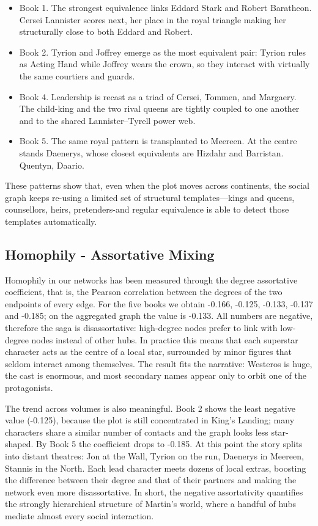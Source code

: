 \documentclass[12pt, a4paper]{article}
\begin{document}
 \begin{itemize}
     \item Book 1. The strongest equivalence links Eddard Stark and Robert Baratheon. Cersei Lannister scores next, her place in the royal triangle making her structurally close to both Eddard and Robert.
     \item Book 2. Tyrion and Joffrey emerge as the most equivalent pair: Tyrion rules as Acting Hand while Joffrey wears the crown, so they interact with virtually the same courtiers and guards.
     \item Book 4. Leadership is recast as a triad of Cersei, Tommen, and Margaery. The child-king and the two rival queens are tightly coupled to one another and to the shared Lannister–Tyrell power web.
     \item Book 5. The same royal pattern is transplanted to Meereen. At the centre stands Daenerys, whose closest equivalents are Hizdahr and Barristan. Quentyn, Daario.
 \end{itemize}

These patterns show that, even when the plot moves across continents, the social graph keeps re-using a limited set of structural templates—kings and queens, counsellors, heirs, pretenders-and regular equivalence is able to detect those templates automatically.

\subsection*{Homophily - Assortative Mixing}

Homophily in our networks has been measured through the degree assortative coefficient, that is, the Pearson correlation between the degrees of the two endpoints of every edge.
For the five books we obtain -0.166, -0.125, -0.133, -0.137 and -0.185; on the aggregated graph the value is -0.133.
All numbers are negative, therefore the saga is disassortative: high-degree nodes prefer to link with low-degree nodes instead of other hubs.
In practice this means that each superstar character acts as the centre of a local star, surrounded by minor figures that seldom interact among themselves.
The result fits the narrative: Westeros is huge, the cast is enormous, and most secondary names appear only to orbit one of the protagonists.

The trend across volumes is also meaningful. Book 2 shows the least negative value (-0.125), because the plot is still concentrated in King's Landing; many characters share a similar number of contacts and the graph looks less star-shaped.
By Book 5 the coefficient drops to -0.185.  At this point the story splits into distant theatres: Jon at the Wall, Tyrion on the run, Daenerys in Meereen, Stannis in the North.  Each lead character meets dozens of local extras, boosting the difference between their degree and that of their partners and making the network even more disassortative.
In short, the negative assortativity quantifies the strongly hierarchical structure of Martin's world, where a handful of hubs mediate almost every social interaction.
\end{document}
